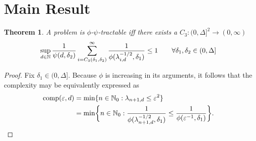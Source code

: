 \documentclass{article}
\newtheorem{theorem}{Theorem}
\theoremstyle{definition}
\begin{document}
\section{Main Result}
\begin{theorem} A problem is $\phi$-$\psi$-tractable iff there exists a  $C_3 : (0,\Delta]^2 \to (0,\infty)$
\begin{equation} \label{eq:tractiff}
    \sup_{d \in \mathbb{N}} \frac{1}{\psi(d,\delta_2)} \sum_{i = C_3(\delta_1,\delta_2)}^\infty \frac{1}{\phi(\lambda_{i, d}^{-1/2},\delta_1)} \le 1 \qquad \forall \delta_1, \delta_2 \in (0,\Delta]
\end{equation}
\end{theorem}
\begin{proof}
Fix $\delta_1 \in (0,\Delta]$.  Because $\phi$ is increasing in its arguments, it follows that the complexity may be equivalently expressed as 
\begin{align*}
    \operatorname{comp}(\varepsilon, d) &= \min \{n \in \mathbb{N}_{0} : \lambda_{n+1, d} \le \varepsilon^2\} \\
    &= \min \biggl\{n \in \mathbb{N}_{0} : \frac{1}{\phi(\lambda_{n+1, d}^{-1/2},\delta_1)} \le \frac{1}{\phi(\varepsilon^{-1},\delta_1)} \biggr\}.
\end{align*}


\end{proof}
\end{document}
